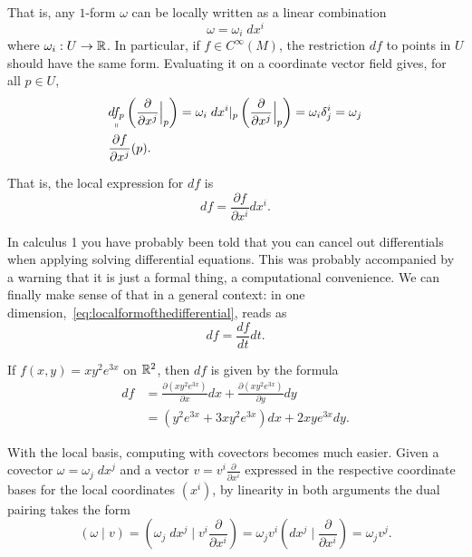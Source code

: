 That is, any $1$-form $\omega$ can be locally written as a linear combination
\begin{equation}
  \omega = \omega_i\; dx^i
\end{equation}
where $\omega_i:U\to\mathbb{R}$.
In particular, if $f\in C^\infty(M)$, the restriction $df$ to points in $U$ should have the same form.
Evaluating it on a coordinate vector field gives, for all $p\in U$,
\begin{align}
  &\underset{\shortparallel}{df_p} \left(\frac{\partial}{\partial x^j}\Big|_p\right)
  = \omega_i\; dx^i|_p \left(\frac{\partial}{\partial x^j}\Big|_p\right) = 
  \omega_i \delta^i_j = \omega_j \\
  & \frac{\partial f}{\partial x^j}(p).
\end{align}

That is, the local expression for $df$ is
\begin{equation}\label{eq:localformofthedifferential}
  df =  \frac{\partial f}{\partial x^i} dx^i.
\end{equation}

\begin{remark}
  In calculus 1 you have probably been told that you can cancel out differentials when applying solving differential equations.
  This was probably accompanied by a warning that it is just a formal thing, a computational convenience.
  We can finally make sense of that in a general context: in one dimension,~\eqref{eq:localformofthedifferential}, reads as
  \begin{equation}
    d f = \frac{df}{dt}dt.
  \end{equation}
\end{remark}

\begin{example}\label{ex:diff1}
  If $f(x,y) = x y^2 e^{3x}$ on $\mathbb{R}^2$, then $df$ is given by the formula
  \begin{align}
    df
    &= \frac{\partial (x y^2 e^{3x})}{\partial x} dx + \frac{\partial (x y^2 e^{3x})}{\partial y} dy \\
    &= (y^2 e^{3x} +3xy^2 e^{3x}) dx + 2xy e^{3x} dy.
  \end{align}
\end{example}

With the local basis, computing with covectors becomes much easier.
Given a covector $\omega = \omega_j\; dx^j$ and a vector $v = v^i \frac{\partial}{\partial x^i}$ expressed in the respective coordinate bases for the local coordinates $(x^i)$, by linearity in both arguments the dual pairing takes the form
\begin{equation}\label{eq:localdualpairing}
  (\omega \mid v) =
  \left(\omega_j\; dx^j \;\Big |\; v^i \frac{\partial}{\partial x^i} \right) =
  \omega_j v^i \left(dx^j \;\Big |\; \frac{\partial}{\partial x^i} \right) =
  \omega_j v^j.
\end{equation}

